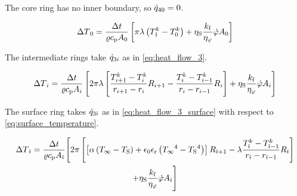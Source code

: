 \documentclass{scrartcl}
\begin{document}
    \noindent The core ring has no inner boundary, so ${\dot{q}}_{40} = 0$.

    \begin{equation}
        {\Delta T}_0 = \frac{{\Delta t}}{{\varrho}{c_\mathrm{p}}{A}_0} \left[ \pi {\lambda} \left( {T}_1^{k} - {T}_0^{k} \right) + {\eta_\mathrm{S}} \frac{{k_\mathrm{f}}}{{\eta_\varphi}} {\dot{\varphi}} {A}_0 \right]
        \label{eq:increment_core}
    \end{equation}

    \noindent The intermediate rings take ${\dot{q}}_{3{i}}$ as in \autoref{eq:heat_flow_3}.

    \begin{equation}
        {\Delta T}_{i} = \frac{{\Delta t}}{{\varrho}{c_\mathrm{p}}{A}_{i}}
        \left[
        2 \pi {\lambda} \left[
            \frac{{T}_{{i}+1}^{k} - {T}_{i}^{k}}{{r}_{{i}+1}-{r}_{{i}}}
            {R}_{{i}+1}
            -\frac{{T}_{{i}}^{k} - {T}_{{i}-1}^{k}}{{r}_{{i}}-{r}_{{i}-1}}
            {R}_{{i}}
            \right]
        + {\eta_\mathrm{S}} \frac{{k_\mathrm{f}}}{{\eta_\varphi}} {\dot{\varphi}} {A}_{{i}}
        \right]
        \label{eq:increment_layer}
    \end{equation}

    \noindent The surface ring takes ${\dot{q}}_{3{\hat{\imath}}}$ as in \autoref{eq:heat_flow_3_surface} with respect to \autoref{eq:surface_temperature}.

    \begin{multline}
        {\Delta T}_{\hat{\imath}} = \frac{{\Delta t}}{{\varrho}{c_\mathrm{p}}{A}_{\hat{\imath}}}
        \Biggl[
        2 \pi \left[
            \left[ {\alpha} \left( {T_\infty} - {T_\mathrm{S}} \right) + {\epsilon_0}{\epsilon_\mathrm{r}}\left( {T_\infty}^4 - {T_\mathrm{S}}^4 \right) \right]
            {R}_{{\hat{\imath}}+1}
            -{\lambda} \frac{{T}_{{\hat{\imath}}}^{k} - {T}_{{\hat{\imath}}-1}^{k}}{{r}_{{\hat{\imath}}}-{r}_{{\hat{\imath}}-1}}
            {R}_{{\hat{\imath}}}
            \right] \\
        + {\eta_\mathrm{S}} \frac{{k_\mathrm{f}}}{{\eta_\varphi}} {\dot{\varphi}} {A}_{{\hat{\imath}}}
        \Biggr]
        \label{eq:increment_surface}
    \end{multline}
\end{document}
